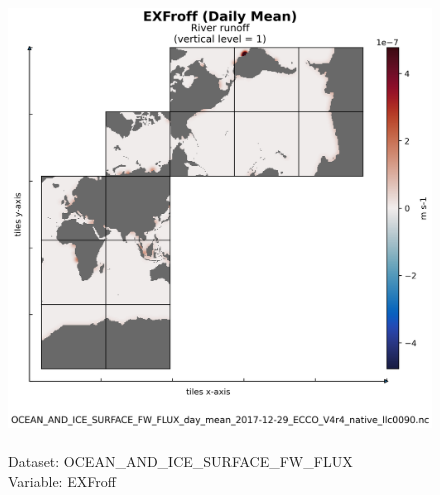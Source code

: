 \begin{figure}[H]
\centering
\includegraphics[scale=0.5]{../images/plots/native_plots/Ocean_and_Sea-Ice_Surface_Freshwater_Fluxes/EXFroff.png}
\caption{\\Dataset: OCEAN\_AND\_ICE\_SURFACE\_FW\_FLUX\\Variable: EXFroff}
\label{tab:table-OCEAN_AND_ICE_SURFACE_FW_FLUX_EXFroff-Plot}
\end{figure}
\pagebreak
